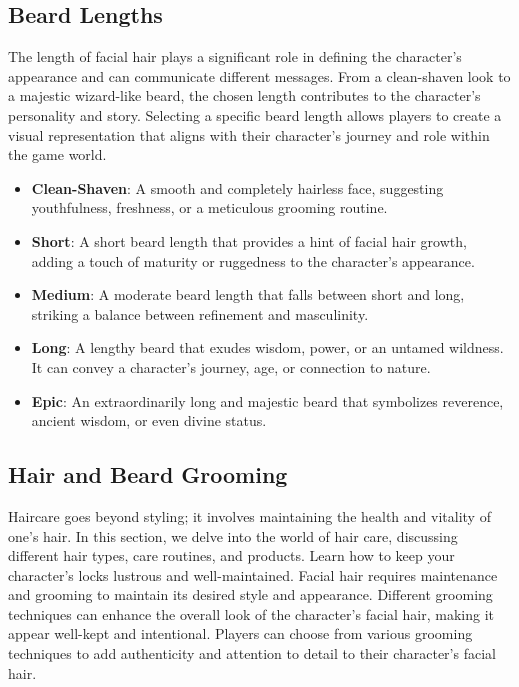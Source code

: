 \documentclass[12pt]{book}  %
\begin{document}
\subsection{\textbf{Beard Lengths}}

The length of facial hair plays a significant role in defining the character's appearance and can communicate different messages. From a clean-shaven look to a majestic wizard-like beard, the chosen length contributes to the character's personality and story. Selecting a specific beard length allows players to create a visual representation that aligns with their character's journey and role within the game world.

\begin{itemize}
    \item \textbf{Clean-Shaven}: A smooth and completely hairless face, suggesting youthfulness, freshness, or a meticulous grooming routine.
    \item \textbf{Short}: A short beard length that provides a hint of facial hair growth, adding a touch of maturity or ruggedness to the character's appearance.
    \item \textbf{Medium}: A moderate beard length that falls between short and long, striking a balance between refinement and masculinity.
    \item \textbf{Long}: A lengthy beard that exudes wisdom, power, or an untamed wildness. It can convey a character's journey, age, or connection to nature.
    \item \textbf{Epic}: An extraordinarily long and majestic beard that symbolizes reverence, ancient wisdom, or even divine status.
\end{itemize}

\subsection{\textbf{Hair and Beard Grooming}}

Haircare goes beyond styling; it involves maintaining the health and vitality of one's hair. In this section, we delve into the world of hair care, discussing different hair types, care routines, and products. Learn how to keep your character's locks lustrous and well-maintained. Facial hair requires maintenance and grooming to maintain its desired style and appearance. Different grooming techniques can enhance the overall look of the character's facial hair, making it appear well-kept and intentional. Players can choose from various grooming techniques to add authenticity and attention to detail to their character's facial hair.
\end{document}
